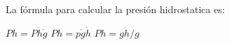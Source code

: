 
\question La fórmula para calcular la presión hidrostatica es:

  \begin{oneparchoices}
    \choice $ Ph = P \dot h \dot g $
    \CorrectChoice $ Ph = p \dot g \dot h $
    \choice $ Ph = g \dot h / g $
  \end{oneparchoices}
